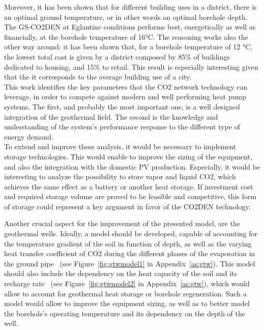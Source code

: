 \documentclass{article}
\begin{document}
Moreover, it has been shown that for different building uses in a district, there is an optimal ground temperature, or in other words an optimal borehole depth. The GS-CO2DEN at Eglantine conditions performs best, energetically as well as financially, at the borehole temperature of 16\si{\celsius}. The reasoning works also the other way around: it has been shown that, for a borehole temperature of 12 \si{\celsius}, the lowest total cost is given by a district composed by 85\% of buildings dedicated to housing, and 15\% to retail. This result is especially interesting given that the it corresponds to the average building use of a city.\\

This work identifies the key parameters that the CO2 network technology can leverage, in order to compete against modern and well performing heat pump systems. The first, and probably the most important one, is a well designed integration of the geothermal field. The second is the knowledge and understanding of the system's performance response to the different type of energy demand.\\

To extend and improve these analysis, it would be necessary to implement storage technologies. This would enable to improve the sizing of the equipment, and also the integration with the domestic PV production. Especially, it would be interesting to analyze the possibility to store vapor and liquid CO2, which achieves the same effect as a battery or another heat storage. If investment cost and required storage volume are proved to be feasible and competitive, this form of storage could represent a key argument in favor of the CO2DEN technology.

Another crucial aspect for the improvement of the presented model, are the geothermal wells. 
Ideally, a model should be developed, capable of accounting for the temperature gradient of the soil in function of depth, as well as the varying heat transfer coefficient of CO2 during the different phases of the evaporation in the ground pipe~\cite{badacheExperimentalStudyCarbon2018,lamarcheReviewMethodsEvaluate2010} (see Figure~\ref{fig:gtwmodel1} in Appendix~\ref{as:gtw}).
This model should also include the dependency on the heat capacity of the soil and its recharge rate~\cite{jiaReviewEffectiveThermal2019,lamarcheReviewMethodsEvaluate2010,zengHeatTransferAnalysis2003} (see Figure~\ref{fig:gtwmodel2} in Appendix~\ref{as:gtw}), which would allow to account for geothermal heat storage or borehole regeneration.
Such a model would allow to improve the equipment sizing, as well as to better model the borehole's operating temperature and its dependency on the depth of the well.
\end{document}
